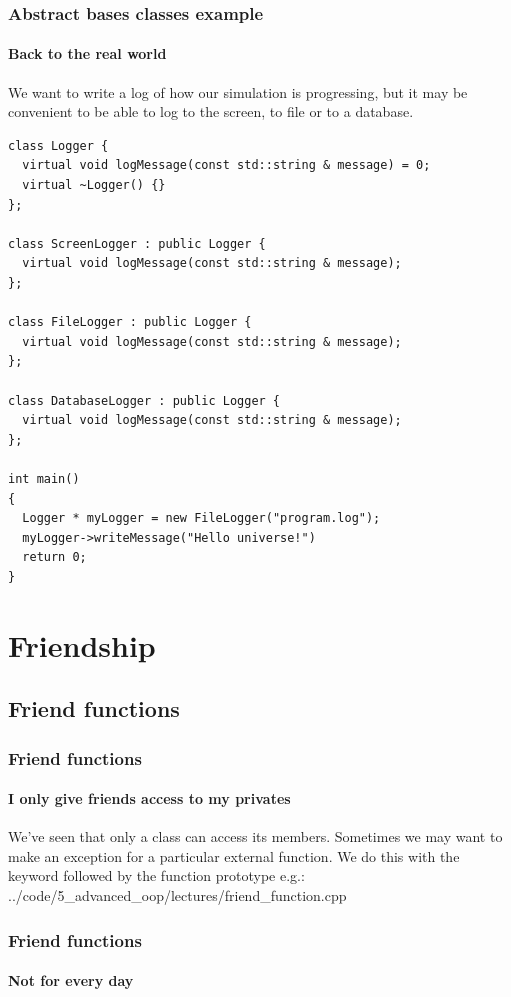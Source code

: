 \documentclass[handout]{beamer}
\begin{document}
\begin{frame}[fragile]
  \frametitle{Abstract bases classes example}
  \framesubtitle{Back to the real world}
  We want to write a log of how our simulation is progressing, but it may be convenient to be able to log to the screen, to file or to a database.
  \begin{lstlisting}[basicstyle=\ttfamily\fontsize{7}{8}\selectfont]
class Logger {
  virtual void logMessage(const std::string & message) = 0;
  virtual ~Logger() {}
};

class ScreenLogger : public Logger {
  virtual void logMessage(const std::string & message);
};

class FileLogger : public Logger {
  virtual void logMessage(const std::string & message);
};

class DatabaseLogger : public Logger {
  virtual void logMessage(const std::string & message);
};

int main()
{
  Logger * myLogger = new FileLogger("program.log");
  myLogger->writeMessage("Hello universe!")
  return 0;
}
  \end{lstlisting}

\end{frame}


\section{Friendship}

\subsection{Friend functions}

\begin{frame}[fragile]
  \frametitle{Friend functions}
  \framesubtitle{I only give friends access to my privates}
  
  We've seen that only a class can access its  members.  Sometimes we may want to make an exception for a particular external function.  We do this with the  keyword followed by the function prototype e.g.:
  \pause
    {../code/5_advanced_oop/lectures/friend_function.cpp}

\end{frame}

\begin{frame}[fragile]
  \frametitle{Friend functions}
  \framesubtitle{Not for every day}
  

\end{frame}
\end{document}
